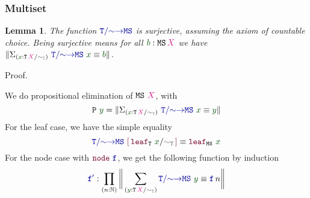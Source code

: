 \documentclass[xelatex,mathserif,serif,notheorems]{beamer} %
\theoremstyle{plain} %
\newtheorem{lem}[thm]{Lemma}
\theoremstyle{definition}
\theoremstyle{remark}
\newcommand*{\term}[1]{\textcolor{green!30!black}{#1}} %
\newcommand*{\type}[1]{\textcolor{magenta!90!black}{#1}}
\newcommand*{\relation}[1]{\textcolor{gray!75!black}{\ensuremath{\mathtt{#1}}}}
\newcommand*{\function}[1]{\textcolor{blue!60!black}{\ensuremath{\mathtt{#1}}}}
\newcommand*{\constructor}[1]{\textcolor{purple!60!black}{\ensuremath{\mathtt{#1}}}}
\newcommand*{\typeformer}[1]{\ensuremath{\mathtt{#1}}}
\newcommand*{\quotientconstructor}[1]{\constructor{[}\,#1\,\constructor{]}}
\newcommand{\setlengths}{
  \setlength{\abovedisplayskip}{4pt}
  \setlength{\belowdisplayskip}{4pt}
  \setlength{\abovedisplayshortskip}{2pt}
  \setlength{\belowdisplayshortskip}{2pt}
}
\begin{document}
\begin{frame}
  \frametitle{Multiset}
  \begin{lem}
    The function \(\function{T/{\sim}{\rightarrow}MS}\) is surjective, assuming the axiom of countable choice. Being surjective means for all \(\term{b} : \typeformer{MS}\,\type{X}\) we have \(\| \Sigma_{(\term{x} : \typeformer{T}\,\type{X} / \relation{\sim_{T}})}~\function{T/{\sim}{\rightarrow}MS}~\term{x} \equiv \term{b} \|\).
  \end{lem}
    \begin{block}{Proof.}\setlengths
      We do propositional elimination of \(\typeformer{MS}~\type{X}\), with
      \begin{equation}
        \typeformer{P}~\term{y} = \| \Sigma_{(\term{x} : \typeformer{T}\,\type{X} / \relation{\sim_{T}})}~\function{T/{\sim}{\rightarrow}MS}~\term{x} \equiv \term{y} \|
      \end{equation}
      For the leaf case, we have the simple equality
      \begin{equation}
        \function{T/{\sim}{\rightarrow}MS}~\quotientconstructor{\constructor{leaf}_{\typeformer{T}}~\term{x} / \relation{\sim_{T}}} \equiv \constructor{leaf}_{\typeformer{MS}}~\term{x}
      \end{equation}
      For the node case with \(\constructor{node}~\function{f}\), we get the following function by induction
    \begin{equation}
      \function{f'} : \prod_{(n : \mathbb{N})} \bigg\| \sum_{(\term{y} : \typeformer{T}\,\type{X} / \relation{\sim_{T}})} \function{T/{\sim}{\rightarrow}MS}~\term{y} \equiv \function{f}\,n \bigg\|
    \end{equation}
  \end{block}
\end{frame}
\end{document}
